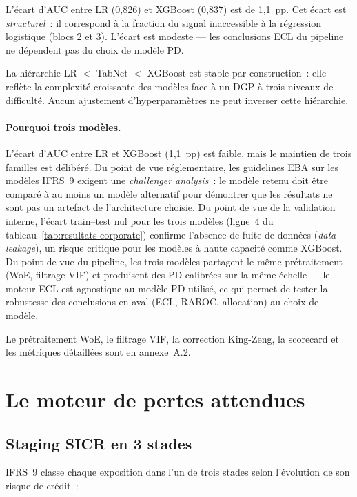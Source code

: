 \documentclass[10pt, a4paper, oneside]{report}
\theoremstyle{definition}
\begin{document}
L'écart d'AUC entre LR (0{,}826) et XGBoost (0{,}837) est de 1{,}1~pp. Cet écart est \emph{structurel}~: il correspond à la fraction du signal inaccessible à la régression logistique (blocs 2 et 3). L'écart est modeste --- les conclusions ECL du pipeline ne dépendent pas du choix de modèle PD.

La hiérarchie LR $<$ TabNet $<$ XGBoost est stable par construction~: elle reflète la complexité croissante des modèles face à un DGP à trois niveaux de difficulté. Aucun ajustement d'hyperparamètres ne peut inverser cette hiérarchie.

\paragraph{Pourquoi trois modèles.} L'écart d'AUC entre LR et XGBoost (1{,}1~pp) est faible, mais le maintien de trois familles est délibéré. Du point de vue réglementaire, les guidelines EBA sur les modèles IFRS~9 \citep{eba_st_2023} exigent une \emph{challenger analysis}~: le modèle retenu doit être comparé à au moins un modèle alternatif pour démontrer que les résultats ne sont pas un artefact de l'architecture choisie. Du point de vue de la validation interne, l'écart train--test nul pour les trois modèles (ligne~4 du tableau~\ref{tab:resultats-corporate}) confirme l'absence de fuite de données (\emph{data leakage}), un risque critique pour les modèles à haute capacité comme XGBoost. Du point de vue du pipeline, les trois modèles partagent le même prétraitement (WoE, filtrage VIF) et produisent des PD calibrées sur la même échelle --- le moteur ECL est agnostique au modèle PD utilisé, ce qui permet de tester la robustesse des conclusions en aval (ECL, RAROC, allocation) au choix de modèle.

Le prétraitement WoE, le filtrage VIF, la correction King-Zeng, la scorecard et les métriques détaillées sont en annexe~A.2.


\section{Le moteur de pertes attendues}
\label{sec:ch1:ecl}

\subsection{Staging SICR en 3 stades}

IFRS~9 classe chaque exposition dans l'un de trois stades selon l'évolution de son risque de crédit~:
\end{document}
